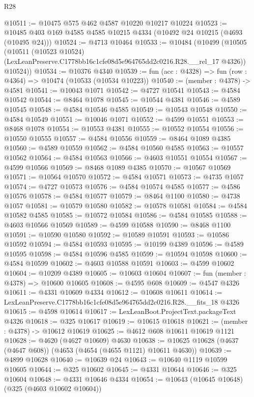 \begin{lexlean}{R28}
\begin{coremodule}
@10511 := @10475 @575 @462 @4587 @10220 @10217 @10224
@10523 := @10485 @403 @169 @4585 @4585 @10215 @4334 (@10492 @24 @10215 (@4693 (@10495 @24)))
@10524 := @4713 @10464
@10533 := @10484
    (@10499
      (@10505
        (@10511
          (@10523 @10524)
          (LexLeanPreserve.C1778bb16c1cfe08d5e964765dd2c0216.R28.__rel_17 @4326))
        @10524))
@10534 := @10376 @4340
@10539 := fun (acc : @4328) => fun (row : @4364) => @10474 (@10533 (@10534 @10223))
@10540 := (member : @4378) -> @4581
@10541 := @10043 @1071
@10542 := @4727 @10541
@10543 := @4584 @10542
@10544 := @8464 @1078
@10545 := @10544 @4381
@10546 := @4589 @10545
@10548 := @4584 @10546 @4585
@10549 := @10543 @10548
@10550 := @4584 @10549
@10551 := @10046 @1071
@10552 := @4599 @10551
@10553 := @8468 @1078
@10554 := @10553 @4381
@10555 := @10552 @10554
@10556 := @10550 @10555
@10557 := @4584 @10556
@10559 := @8464 @1089 @4385
@10560 := @4589 @10559
@10562 := @4584 @10560 @4585
@10563 := @10557 @10562
@10564 := @4584 @10563
@10566 := @4603 @10551 @10554
@10567 := @4599 @10566
@10569 := @8468 @1089 @4385
@10570 := @10567 @10569
@10571 := @10564 @10570
@10572 := @4584 @10571
@10573 := @4735 @1057
@10574 := @4727 @10573
@10576 := @4584 @10574 @4585
@10577 := @4586 @10576
@10578 := @4584 @10577
@10579 := @8464 @1100
@10580 := @4738 @1057
@10581 := @10579 @10580
@10582 := @10578 @10581
@10584 := @4584 @10582 @4585
@10585 := @10572 @10584
@10586 := @4584 @10585
@10588 := @4603 @10566 @10569
@10589 := @4599 @10588
@10590 := @8468 @1100
@10591 := @10590 @10580
@10592 := @10589 @10591
@10593 := @10586 @10592
@10594 := @4584 @10593
@10595 := @10199 @4389
@10596 := @4589 @10595
@10598 := @4584 @10596 @4585
@10599 := @10594 @10598
@10600 := @4584 @10599
@10602 := @4603 @10588 @10591
@10603 := @4599 @10602
@10604 := @10209 @4389
@10605 := @10603 @10604
@10607 := fun (member : @4378) => @10600 @10605
@10608 := @4595 @608
@10609 := @4547 @4326
@10611 := @4331 @10609 @4334
@10612 := @10608 @10611
@10614 := LexLeanPreserve.C1778bb16c1cfe08d5e964765dd2c0216.R28.__fits_18 @4326
@10615 := @4598 @10614
@10617 := LexLeanBoot.ProjectText.packageText @4326
@10618 := @325 @10617
@10619 := @10615 @10618
@10621 := (member : @4378) -> @10612 @10619
@10625 := @4612 @608 @10611 @10619 @1121
@10628 := @4620 (@4627 @10609) @4630
@10638 := @10625 @10628 (@4637 (@4647 @608)) (@4653 (@4654 (@4655 @1121) @10611 @4630))
@10639 := @4899 @10628
@10640 := @10639 @24
@10643 := @10640 @1119 @10599 @10605
@10644 := @325 @10602
@10645 := @4331 @10644
@10646 := @325 @10604
@10648 := @4331 @10646 @4334
@10654 := @10643 (@10645 @10648) (@325 (@4603 @10602 @10604))

\end{coremodule}
\end{lexlean}

